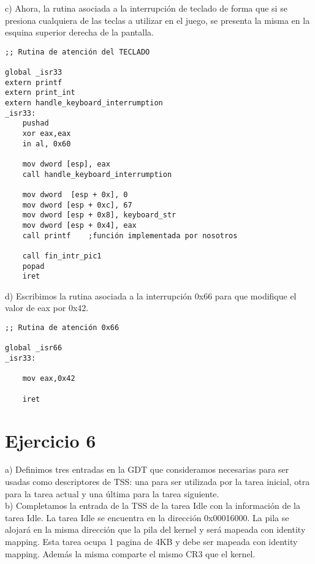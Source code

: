 \documentclass[a4paper]{article}
\begin{document}
{\large c)} Ahora, la rutina asociada a la interrupci\'on de teclado de forma que si se presiona cualquiera
de las teclas a utilizar en el juego, se presenta la misma en la esquina superior derecha de la pantalla. \\

\begin{codesnippet}
\begin{verbatim}
;; Rutina de atención del TECLADO

global _isr33
extern printf
extern print_int
extern handle_keyboard_interrumption
_isr33:
    pushad
    xor eax,eax
    in al, 0x60

    mov dword [esp], eax
    call handle_keyboard_interrumption
    
    mov dword  [esp + 0x], 0
    mov dword [esp + 0xc], 67
    mov dword [esp + 0x8], keyboard_str
    mov dword [esp + 0x4], eax
    call printf    ;función implementada por nosotros

    call fin_intr_pic1
    popad
    iret
\end{verbatim}
\end{codesnippet}


{\large d)} Escribimos la rutina asociada a la interrupci\'on 0x66 para que modifique el valor de eax por
0x42. 
\begin{codesnippet}
\begin{verbatim}
;; Rutina de atención 0x66

global _isr66
_isr33:

    mov eax,0x42
  
    iret
\end{verbatim}
\end{codesnippet}

\newpage
\section{Ejercicio 6}
{\large a)} Definimos tres entradas en la GDT que consideramos necesarias para ser usadas como descriptores
de TSS: una para ser utilizada por la tarea inicial, otra para la tarea actual y una \'ultima para la tarea siguiente.\\

{\large b)} Completamos la entrada de la TSS de la tarea Idle con la informaci\'on de la tarea Idle. La tarea Idle se encuentra en la direcci\'on 0x00016000. La pila se alojar\'a en la misma direcci\'on que la pila del kernel y ser\'a mapeada
con identity mapping. Esta tarea ocupa 1 pagina de 4KB y debe ser mapeada con identity mapping. Adem\'as la misma comparte el mismo CR3 que el kernel. \\
\end{document}
